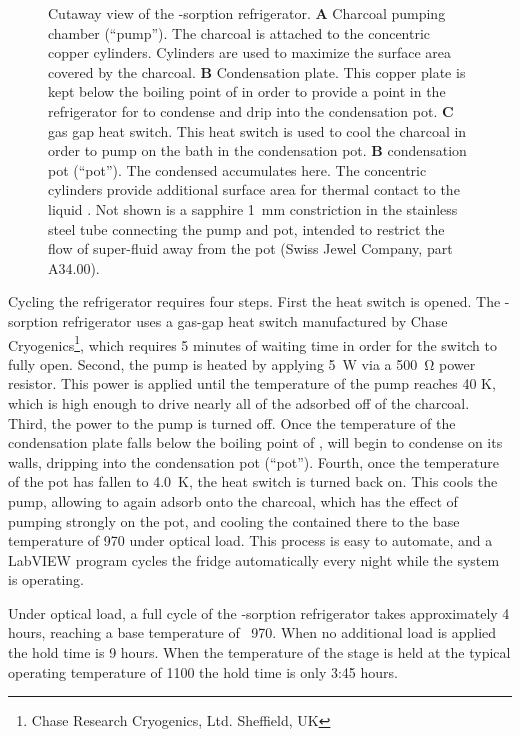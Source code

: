 \begin{figure}
\caption{Cutaway view of the -sorption refrigerator. \textbf{A} Charcoal pumping chamber (``pump''). The charcoal is attached to the concentric copper cylinders. Cylinders are used to maximize the surface area covered by the charcoal. \textbf{B} Condensation plate. This copper plate is kept below the boiling point of  in order to provide a point in the refrigerator for  to condense and drip into the condensation pot. \textbf{C}  gas gap heat switch. This heat switch is used to cool the charcoal in order to pump on the  bath in the condensation pot. \textbf{B}  condensation pot (``pot''). The condensed  accumulates here. The concentric cylinders provide additional surface area for thermal contact to the liquid . Not shown is a sapphire \SI{1}{\mm} constriction in the stainless steel tube connecting the pump and pot, intended to restrict the flow of super-fluid  away from the pot (Swiss Jewel Company, part A34.00).}
\label{fig:he4sorp}
\end{figure}

Cycling the refrigerator requires four steps.
First the heat switch is opened.
The -sorption refrigerator uses a  gas-gap heat switch manufactured by Chase Cryogenics\footnote{Chase Research Cryogenics, Ltd. Sheffield, UK}, which requires 5 minutes of waiting time in order for the switch to fully open.
Second, the pump is heated by applying \SI{5}{\W} via a \SI{500}{\ohm} power resistor.
This power is applied until the temperature of the pump reaches 40 K, which is high enough to drive nearly all of the adsorbed  off of the charcoal.
Third, the power to the pump is turned off.
Once the temperature of the condensation plate falls below the boiling point of ,  will begin to condense on its walls, dripping into the  condensation pot (``pot'').
Fourth, once the temperature of the pot has fallen to \SI{4.0}{\K}, the heat switch is turned back on.
This cools the pump, allowing  to again adsorb onto the charcoal, which has the effect of pumping strongly on the pot, and cooling the  contained there to the base temperature of \SI{970}{\mK} under optical load.
This process is easy to automate, and a LabVIEW program cycles the fridge automatically every night while the system is operating.

Under optical load, a full cycle of the -sorption refrigerator takes approximately 4 hours, reaching a base temperature of ~\SI{970}{\mK}.
When no additional load is applied the hold time is 9 hours.
When the temperature of the stage is held at the typical operating temperature of \SI{1100}{\mK} the hold time is only 3:45 hours.

